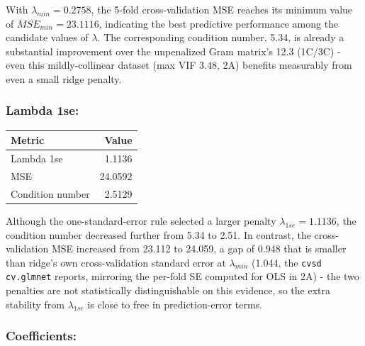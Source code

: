 \documentclass[
  11pt,
]{article}
\newcounter{none} %
\begin{document}
With \(\lambda_{min} = 0.2758\), the 5-fold cross-validation MSE reaches
its minimum value of \(MSE_{min} = 23.1116\), indicating the best
predictive performance among the candidate values of \(\lambda\). The
corresponding condition number, 5.34, is already a substantial
improvement over the unpenalized Gram matrix's 12.3 (1C/3C) - even this
mildly-collinear dataset (max VIF 3.48, 2A) benefits measurably from
even a small ridge penalty.

\subsubsection{Lambda 1se:}\label{lambda-1se}

{\def\LTcaptype{none} %
\begin{longtable}[]{@{}lr@{}}
\toprule\noalign{}
Metric & Value \\
\midrule\noalign{}
\endhead
\bottomrule\noalign{}
\endlastfoot
Lambda 1se & 1.1136 \\
MSE & 24.0592 \\
Condition number & 2.5129 \\
\end{longtable}
}

Although the one-standard-error rule selected a larger penalty
\(\lambda_{1se} = 1.1136\), the condition number decreased further from
5.34 to 2.51. In contrast, the cross-validation MSE increased from
23.112 to 24.059, a gap of 0.948 that is smaller than ridge's own
cross-validation standard error at \(\lambda_{min}\) (1.044, the
\texttt{cvsd} \texttt{cv.glmnet} reports, mirroring the per-fold SE
computed for OLS in 2A) - the two penalties are not statistically
distinguishable on this evidence, so the extra stability from
\(\lambda_{1se}\) is close to free in prediction-error terms.

\subsubsection{Coefficients:}\label{coefficients}
\end{document}
